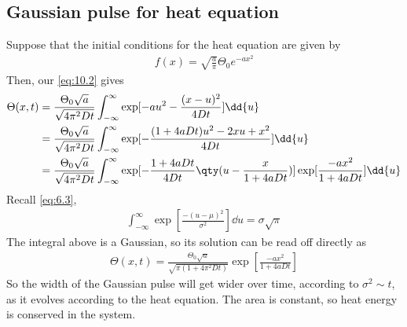 \subsection{Gaussian pulse for heat equation}
Suppose that the initial conditions for the heat equation are given by
\begin{align*}
	f(x) = \sqrt{\frac{a}{\pi}} \Theta_0 e^{-ax^2}
\end{align*}
Then, our \cref{eq:10.2} gives
\begin{align*}
	\Theta(x,t) &= \frac{\Theta_0 \sqrt{a}}{\sqrt{4 \pi^2 D t}} \int_{-\infty}^\infty \exp[-au^2 - \frac{(x-u)^2}{4 D t}] \dd{u} \\
    &= \frac{\Theta_0 \sqrt{a}}{\sqrt{4 \pi^2 D t}} \int_{-\infty}^\infty \exp[-\frac{(1 + 4 a D t)u^2 - 2xu + x^2}{4 D t}] \dd{u} \\
    &= \frac{\Theta_0 \sqrt{a}}{\sqrt{4 \pi^2 D t}} \int_{-\infty}^\infty \exp[-\frac{1 + 4 a D t}{4 D t} \qty(u - \frac{x}{1+4aDt}) ] \exp[ \frac{-ax^2}{1+4aDt}] \dd{u}
\end{align*}
Recall \cref{eq:6.3},
\begin{align*}
	\int_{-\infty}^\infty \exp[\frac{-(u - \mu)^2}{\sigma^2}] \dd{u} = \sigma \sqrt{\pi}
\end{align*}
The integral above is a Gaussian, so its solution can be read off directly as
\begin{align} \label{eq:10.5}
	\Theta(x,t) = \frac{\Theta_0 \sqrt{a}}{\sqrt{\pi (1 + 4 \pi^2 D t)}} \exp[\frac{-ax^2}{1+4aDt}]
\end{align}
So the width of the Gaussian pulse will get wider over time, according to $\sigma^2 \sim t$, as it evolves according to the heat equation.
The area is constant, so heat energy is conserved in the system.

